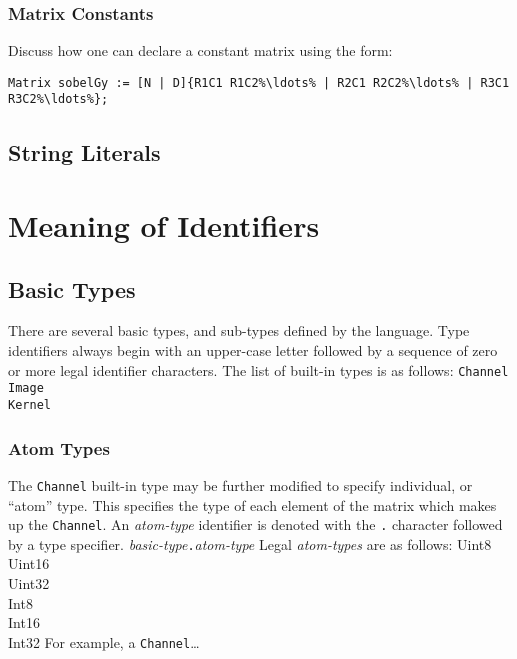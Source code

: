 \subsubsection{Matrix Constants}
\label{sssec:matrixconstants}
Discuss how one can declare a constant matrix using the form:
\begin{lstlisting}[language=CLAM,escapechar=\%]
    Matrix sobelGy := [N | D]{R1C1 R1C2%\ldots% | R2C1 R2C2%\ldots% | R3C1 R3C2%\ldots%};
\end{lstlisting}

\subsection{String Literals}
\label{ssec:strings}

\section{Meaning of Identifiers}
\label{sec:identmeaning}

\subsection{Basic Types}
\label{ssec:types}
There are several basic types, and sub-types defined by the \sys{} language.
Type identifiers always begin with an upper-case letter followed by a sequence
of zero or more legal identifier characters. The list of built-in types is as follows:
\startsyn
\texttt{Channel} \\
\texttt{Image} \\
\texttt{Kernel}
\stopsyn

\subsubsection{Atom Types}
\label{sssec:subtypes}
The \texttt{Channel} built-in type may be further modified to specify
individual, or ``atom'' type. This specifies the type of each element of the
matrix which makes up the \texttt{Channel}. An \emph{atom-type} identifier
is denoted with the \texttt{.} character followed by a type specifier.
\startsyn
\emph{basic-type}\texttt{.}\emph{atom-type}
\stopsyn
Legal \emph{atom-types} are as follows:
\startsyn
Uint8 \\
Uint16 \\
Uint32 \\
Int8 \\
Int16 \\
Int32
\stopsyn
For example, a \texttt{Channel}\ldots

